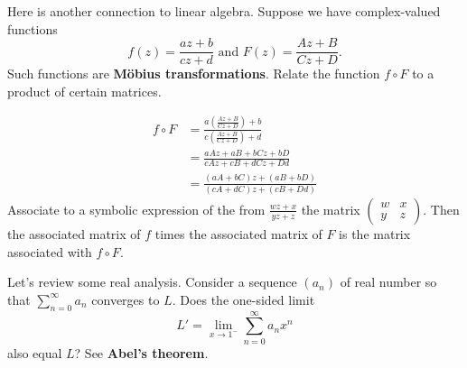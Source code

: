 \documentclass{homework}
\begin{document}
\begin{problem}\label{mobius-transformations}Here is another connection to linear algebra.  Suppose we have complex-valued functions
  \[
    f(z) = \frac{az + b}{cz + d} \mbox{ and }
    F(z) = \frac{Az + B}{Cz + D}.
  \]
  Such functions are \textbf{M\"obius transformations}.  Relate the
  function $f \circ F$ to a product of certain matrices.
\end{problem}
\begin{solution}
\begin{align*}
f \circ F &= \frac{a(\frac{Az + B}{Cz + D}) + b}{c(\frac{Az + B}{Cz + D}) + d}\\
&= \frac{aAz + aB + bCz + bD}{cAz+cB+dCz+Dd}\\
&= \frac{(aA + bC)z + (aB + bD)}{(cA+dC)z+(cB+Dd)}
\end{align*}
Associate to a symbolic expression of the from $\frac{wz + x}{yz+z}$ the matrix $\begin{pmatrix}w&x\\y&z\end{pmatrix}.$
Then the associated matrix of $f$ times the associated matrix of $F$ is the matrix associated with $f\circ F$.
\end{solution}
\begin{problem}\label{abels-theorem}Let's review some real analysis.  Consider a sequence $(a_n)$ of real number so that $\sum_{n=0}^\infty a_n$ converges to $L$.  Does the one-sided limit
  \[
    L' = \lim_{x \to 1^{-}} \sum_{n=0}^\infty a_n x^n
  \]
  also equal $L$?  See \textbf{Abel's theorem}.
\end{problem}
\end{document}
